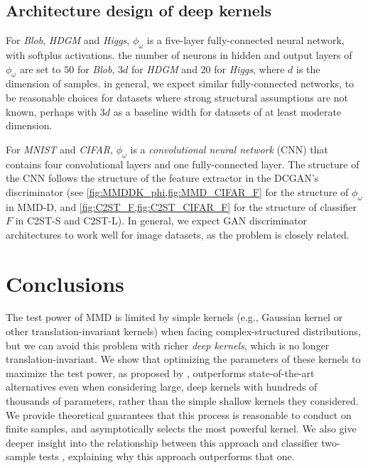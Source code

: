 \documentclass{article}
\begin{document}
\subsection{Architecture design of deep kernels}
For \emph{Blob}, \emph{HDGM} and \emph{Higgs}, $\phi_\omega$ is a five-layer fully-connected neural network, with softplus activations. the number of neurons in hidden and output layers of $\phi_\omega$ are set to $50$ for \emph{Blob}, $3 d$ for \emph{HDGM} and $20$ for \emph{Higgs}, where $d$ is the dimension of samples.
in general, we expect similar fully-connected networks,
to be reasonable choices for datasets where strong structural assumptions are not known,
perhaps with $3 d$ as a baseline width for datasets of at least moderate dimension.

For \emph{MNIST} and \emph{CIFAR}, $\phi_\omega$ is a \emph{convolutional neural network} (CNN) that contains four convolutional layers and one fully-connected layer.
The structure of the CNN follows the structure of the feature extractor in the DCGAN's discriminator \citep{DCGAN_Radford} (see \cref{fig:MMDDK_phi,fig:MMD_CIFAR_F} for the structure of $\phi_\omega$ in MMD-D, and \cref{fig:C2ST_F,fig:C2ST_CIFAR_F} for the structure of classifier $F$ in C2ST-S and C2ST-L).
In general, we expect GAN discriminator architectures to work well for image datasets,
as the problem is closely related.







\section{Conclusions}
The test power of MMD is limited by simple kernels (e.g., Gaussian kernel or other translation-invariant kernels) when facing complex-structured distributions,
but we can avoid this problem with richer \emph{deep kernels}, which is no longer translation-invariant.
We show that optimizing the parameters of these kernels to maximize the test power,
as proposed by \citet{sutherland:mmd-opt},
outperforms state-of-the-art alternatives
even when considering large, deep kernels with hundreds of thousands of parameters,
rather than the simple shallow kernels they considered.
We provide theoretical guarantees that this process is reasonable to conduct on finite samples, and asymptotically selects the most powerful kernel.
We also give deeper insight into the relationship between this approach and classifier two-sample tests \citep{Lopez:C2ST},
explaining why this approach outperforms that one.
\end{document}
